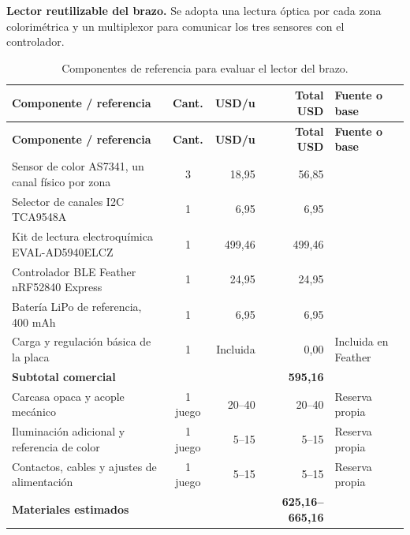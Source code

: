 \noindent\textbf{Lector reutilizable del brazo.}
Se adopta una lectura óptica por cada zona colorimétrica y un multiplexor para comunicar los tres sensores con el controlador.
{\footnotesize
\setlength{\tabcolsep}{4pt}
\renewcommand{\arraystretch}{1.18}
\begin{xltabular}{\linewidth}{@{}>{\raggedright\arraybackslash}X c r r >{\raggedright\arraybackslash}p{2.2cm}@{}}
\caption{Componentes de referencia para evaluar el lector del brazo.}\label{tab:costo-lector}\\
\toprule
\textbf{Componente / referencia} & \textbf{Cant.} & \textbf{USD/u} & \textbf{Total USD} & \textbf{Fuente o base}\\
\midrule
\endfirsthead
\toprule
\textbf{Componente / referencia} & \textbf{Cant.} & \textbf{USD/u} & \textbf{Total USD} & \textbf{Fuente o base}\\
\midrule
\endhead
\bottomrule\endfoot


Sensor de color AS7341, un canal físico por zona & 3 & 18,95 & 56,85 & \\
Selector de canales I2C TCA9548A & 1 & 6,95 & 6,95 & \\
Kit de lectura electroquímica EVAL-AD5940ELCZ & 1 & 499,46 & 499,46 & \\
Controlador BLE Feather nRF52840 Express & 1 & 24,95 & 24,95 & \\
Batería LiPo de referencia, 400 mAh & 1 & 6,95 & 6,95 & \\
Carga y regulación básica de la placa & 1 & Incluida & 0,00 & Incluida en Feather\\
\midrule
\textbf{Subtotal comercial} & & & \textbf{595,16} & \\
\midrule
Carcasa opaca y acople mecánico & 1 juego & 20--40 & 20--40 & Reserva propia\\
Iluminación adicional y referencia de color & 1 juego & 5--15 & 5--15 & Reserva propia\\
Contactos, cables y ajustes de alimentación & 1 juego & 5--15 & 5--15 & Reserva propia\\
\midrule
\textbf{Materiales estimados} & & & \textbf{625,16--665,16} & \\
\bottomrule
\end{xltabular}
}

